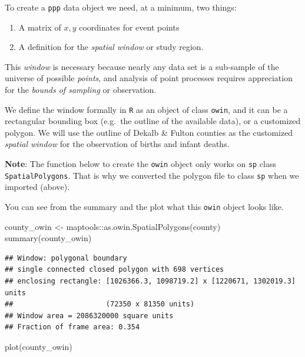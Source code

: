 \documentclass[
]{book}
\newenvironment{Shaded}{\begin{snugshade}}{\end{snugshade}}
\newcommand{\FunctionTok}[1]{\textcolor[rgb]{0.00,0.00,0.00}{#1}}
\newcommand{\NormalTok}[1]{#1}
\newcommand{\OtherTok}[1]{\textcolor[rgb]{0.56,0.35,0.01}{#1}}
\newcommand{\SpecialCharTok}[1]{\textcolor[rgb]{0.00,0.00,0.00}{#1}}
\providecommand{\tightlist}{%
  \setlength{\itemsep}{0pt}\setlength{\parskip}{0pt}}
\newenvironment{rmdnote}[1]
  {
  \begin{itemize}
  \renewcommand{\labelitemi}{
    \raisebox{-.7\height}[0pt][0pt]{
      {\setkeys{Gin}{width=3em,keepaspectratio}\texttt{[image: images/\#1]}}
    }
  }
  \setlength{\fboxsep}{1em}
  \begin{note}
  \item
  }
  {
  \end{note}
  \end{itemize}
  }
\begin{document}
To create a \texttt{ppp} data object we need, at a minimum, two things:

\begin{enumerate}
\def\labelenumi{\arabic{enumi}.}
\tightlist
\item
  A matrix of \(x,y\) coordinates for event points
\item
  A definition for the \emph{spatial window} or study region.
\end{enumerate}

This \emph{window} is necessary because nearly any data set is a sub-sample of the universe of possible \emph{points}, and analysis of point processes requires appreciation for the \emph{bounds of sampling} or observation.

We define the window formally in \texttt{R} as an object of class \texttt{owin}, and it can be a rectangular bounding box (e.g.~the outline of the available data), or a customized polygon. We will use the outline of Dekalb \& Fulton counties as the customized \emph{spatial window} for the observation of births and infant deaths.

\begin{rmdnote}{note}
\textbf{Note}:
The function below to create the \texttt{owin} object only works on \texttt{sp} class \texttt{SpatialPolygons}. That is why we converted the polygon file to class \texttt{sp} when we imported (above).

\end{rmdnote}

You can see from the summary and the plot what this \texttt{owin} object looks like.

\begin{Shaded}
\begin{Highlighting}[]
\NormalTok{county\_owin }\OtherTok{\textless{}{-}}\NormalTok{ maptools}\SpecialCharTok{::}\FunctionTok{as.owin.SpatialPolygons}\NormalTok{(county)}
\FunctionTok{summary}\NormalTok{(county\_owin)}
\end{Highlighting}
\end{Shaded}

\begin{verbatim}
## Window: polygonal boundary
## single connected closed polygon with 698 vertices
## enclosing rectangle: [1026366.3, 1098719.2] x [1220671, 1302019.3] units
##                      (72350 x 81350 units)
## Window area = 2086320000 square units
## Fraction of frame area: 0.354
\end{verbatim}

\begin{Shaded}
\begin{Highlighting}[]
\FunctionTok{plot}\NormalTok{(county\_owin)}
\end{Highlighting}
\end{Shaded}
\end{document}
